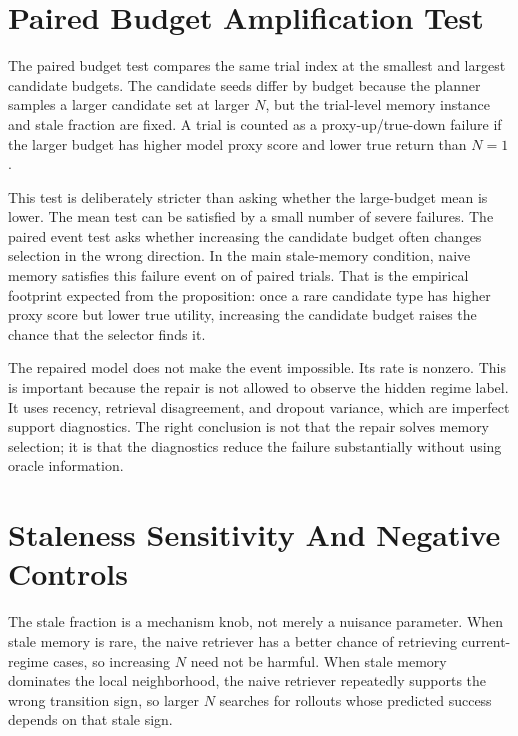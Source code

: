 \documentclass{article}
\begin{document}
\section{Paired Budget Amplification Test}
\label{app:paired-budget}

The paired budget test compares the same trial index at the smallest and
largest candidate budgets. The candidate seeds differ by budget because the
planner samples a larger candidate set at larger $N$, but the trial-level
memory instance and stale fraction are fixed. A trial is counted as a
proxy-up/true-down failure if the larger budget has higher model proxy score
and lower true return than $N=1$.

This test is deliberately stricter than asking whether the large-budget mean is
lower. The mean test can be satisfied by a small number of severe failures. The
paired event test asks whether increasing the candidate budget often changes
selection in the wrong direction. In the main stale-memory condition, naive
memory satisfies this failure event on \EvidenceNaiveHarmRate{} of paired trials.
That is the empirical footprint expected from the proposition: once a rare
candidate type has higher proxy score but lower true utility, increasing the
candidate budget raises the chance that the selector finds it.

The repaired model does not make the event impossible. Its
\EvidenceRepairedHarmRate{} rate is nonzero. This is important because the
repair is not allowed to observe the hidden regime label. It uses recency,
retrieval disagreement, and dropout variance, which are imperfect support
diagnostics. The right conclusion is not that the repair solves memory
selection; it is that the diagnostics reduce the failure substantially without
using oracle information.

\section{Staleness Sensitivity And Negative Controls}
\label{app:staleness}

The stale fraction is a mechanism knob, not merely a nuisance parameter. When
stale memory is rare, the naive retriever has a better chance of retrieving
current-regime cases, so increasing $N$ need not be harmful. When stale memory
dominates the local neighborhood, the naive retriever repeatedly supports the
wrong transition sign, so larger $N$ searches for rollouts whose predicted
success depends on that stale sign.
\end{document}
